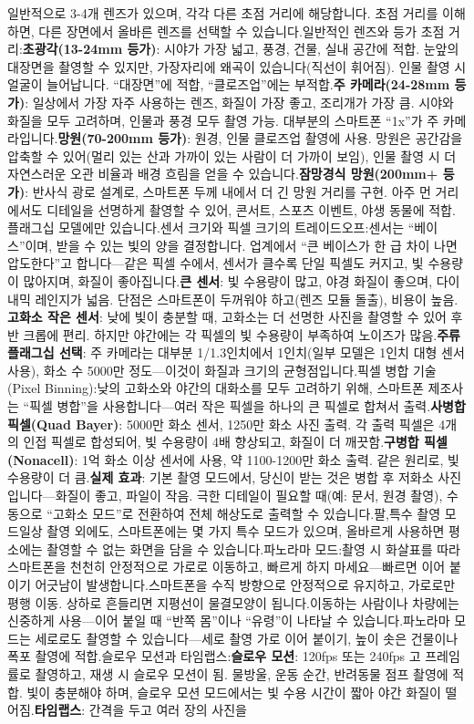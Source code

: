 일반적으로 3-4개 렌즈가 있으며, 각각 다른 초점 거리에 해당합니다. 초점 거리를 이해하면, 다른 장면에서 올바른 렌즈를 선택할 수 있습니다.일반적인 렌즈와 등가 초점 거리:\textbf{초광각(13-24mm 등가)}: 시야가 가장 넓고, 풍경, 건물, 실내 공간에 적합. 눈앞의 대장면을 촬영할 수 있지만, 가장자리에 왜곡이 있습니다(직선이 휘어짐). 인물 촬영 시 얼굴이 늘어납니다. “대장면”에 적합, “클로즈업”에는 부적합.\textbf{주 카메라(24-28mm 등가)}: 일상에서 가장 자주 사용하는 렌즈, 화질이 가장 좋고, 조리개가 가장 큼. 시야와 화질을 모두 고려하며, 인물과 풍경 모두 촬영 가능. 대부분의 스마트폰 “1x”가 주 카메라입니다.\textbf{망원(70-200mm 등가)}: 원경, 인물 클로즈업 촬영에 사용. 망원은 공간감을 압축할 수 있어(멀리 있는 산과 가까이 있는 사람이 더 가까이 보임), 인물 촬영 시 더 자연스러운 오관 비율과 배경 흐림을 얻을 수 있습니다.\textbf{잠망경식 망원(200mm+ 등가)}: 반사식 광로 설계로, 스마트폰 두께 내에서 더 긴 망원 거리를 구현. 아주 먼 거리에서도 디테일을 선명하게 촬영할 수 있어, 콘서트, 스포츠 이벤트, 야생 동물에 적합. 플래그십 모델에만 있습니다.센서 크기와 픽셀 크기의 트레이드오프:센서는 “베이스”이며, 받을 수 있는 빛의 양을 결정합니다. 업계에서 “큰 베이스가 한 급 차이 나면 압도한다”고 합니다—같은 픽셀 수에서, 센서가 클수록 단일 픽셀도 커지고, 빛 수용량이 많아지며, 화질이 좋아집니다.\textbf{큰 센서}: 빛 수용량이 많고, 야경 화질이 좋으며, 다이내믹 레인지가 넓음. 단점은 스마트폰이 두꺼워야 하고(렌즈 모듈 돌출), 비용이 높음.\textbf{고화소 작은 센서}: 낮에 빛이 충분할 때, 고화소는 더 선명한 사진을 촬영할 수 있어 후반 크롭에 편리. 하지만 야간에는 각 픽셀의 빛 수용량이 부족하여 노이즈가 많음.\textbf{주류 플래그십 선택}: 주 카메라는 대부분 1/1.3인치에서 1인치(일부 모델은 1인치 대형 센서 사용), 화소 수 5000만 정도—이것이 화질과 크기의 균형점입니다.픽셀 병합 기술(Pixel Binning):낮의 고화소와 야간의 대화소를 모두 고려하기 위해, 스마트폰 제조사는 “픽셀 병합”을 사용합니다—여러 작은 픽셀을 하나의 큰 픽셀로 합쳐서 출력.\textbf{사병합 픽셀(Quad Bayer)}: 5000만 화소 센서, 1250만 화소 사진 출력. 각 출력 픽셀은 4개의 인접 픽셀로 합성되어, 빛 수용량이 4배 향상되고, 화질이 더 깨끗함.\textbf{구병합 픽셀(Nonacell)}: 1억 화소 이상 센서에 사용, 약 1100-1200만 화소 출력. 같은 원리로, 빛 수용량이 더 큼.\textbf{실제 효과}: 기본 촬영 모드에서, 당신이 받는 것은 병합 후 저화소 사진입니다—화질이 좋고, 파일이 작음. 극한 디테일이 필요할 때(예: 문서, 원경 촬영), 수동으로 “고화소 모드”로 전환하여 전체 해상도로 출력할 수 있습니다.팔,특수 촬영 모드일상 촬영 외에도, 스마트폰에는 몇 가지 특수 모드가 있으며, 올바르게 사용하면 평소에는 촬영할 수 없는 화면을 담을 수 있습니다.파노라마 모드:촬영 시 화살표를 따라 스마트폰을 천천히 안정적으로 가로로 이동하고, 빠르게 하지 마세요—빠르면 이어 붙이기 어긋남이 발생합니다.스마트폰을 수직 방향으로 안정적으로 유지하고, 가로로만 평행 이동. 상하로 흔들리면 지평선이 물결모양이 됩니다.이동하는 사람이나 차량에는 신중하게 사용—이어 붙일 때 “반쪽 몸”이나 “유령”이 나타날 수 있습니다.파노라마 모드는 세로로도 촬영할 수 있습니다—세로 촬영 가로 이어 붙이기, 높이 솟은 건물이나 폭포 촬영에 적합.슬로우 모션과 타임랩스:\textbf{슬로우 모션}: 120fps 또는 240fps 고 프레임률로 촬영하고, 재생 시 슬로우 모션이 됨. 물방울, 운동 순간, 반려동물 점프 촬영에 적합. 빛이 충분해야 하며, 슬로우 모션 모드에서는 빛 수용 시간이 짧아 야간 화질이 떨어짐.\textbf{타임랩스}: 간격을 두고 여러 장의 사진을 